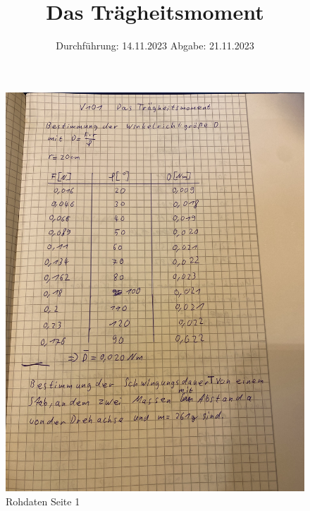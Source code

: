 

\subject{v101}
\title{Das Trägheitsmoment}
\date{%
  Durchführung: 14.11.2023
  \hspace{3em}
  Abgabe: 21.11.2023
}



\maketitle
\thispagestyle{empty}
\tableofcontents
\newpage








\begin{figure}
  \centering
  \includegraphics[width=\textwidth, angle=270]{Bilder/Data1.jpg}
  \caption{Rohdaten Seite 1}
  \label{fig:Data1}
\end{figure}
